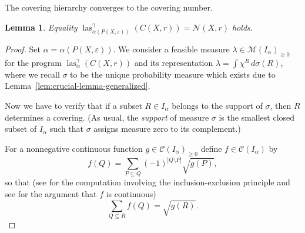 \documentclass{amsart}
\newtheorem{lemma}[defin]{Lemma}
\DeclareMathOperator{\las}{las}
\begin{document}
%

The covering hierarchy converges to the covering number.

\begin{lemma}
  Equality
  $\las^\gamma_{\alpha(P(X,\varepsilon))}(C(X,r)) = \mathcal{N}(X,r)$
  holds.
\end{lemma}

\begin{proof}
  Set $\alpha = \alpha(P(X,\varepsilon))$. We consider a feasible measure
  $\lambda\in \mathcal{M}(I_{\alpha})_{\geq 0}$ for the program $\las^\gamma_{\alpha}(C(X,r)) $ and its
  representation $\lambda=\int \chi^R \, d\sigma(R)$, where we recall $\sigma$ to be the unique probability measure which exists due to Lemma~\ref{lem:crucial-lemma-generalized}.

  Now we have to verify that if a subset
$R \in I_{\alpha}$ belongs to the support of $\sigma$, then $R$ determines a covering.   
(As usual, the \emph{support} of measure $\sigma$ is the smallest closed subset of $I_{\alpha}$
such that $\sigma$ assigns measure zero to its complement.)
  
  For a nonnegative continuous function $g \in \mathcal{C}(I_\alpha)_{\geq 0}$ define $f \in \mathcal{C}(I_\alpha)$ by
  \[
  f(Q) = \sum_{P \subseteq Q} (-1)^{|Q \setminus P|} \sqrt{g(P)},
  \]
  so that (see \cite{de-Laat-Vallentin-2015} for the computation involving the inclusion-exclusion principle and see \cite{Bekker-Oliveria-2023} for the argument that $f$ is continuous)
  \[
  \sum_{Q \subseteq R} f(Q) = \sqrt{g(R)}.
  \]
 

\end{proof}
\end{document}
